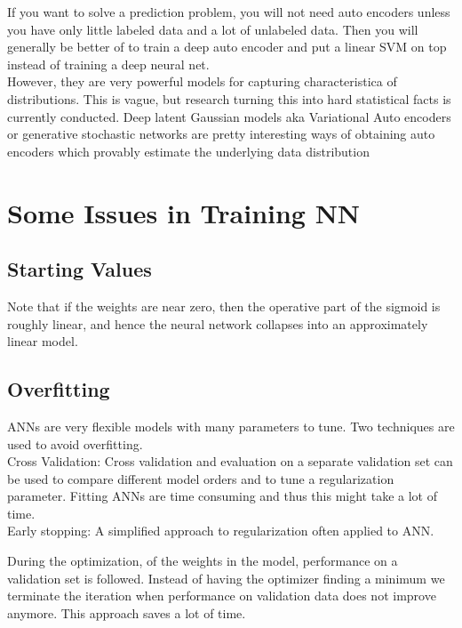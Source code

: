 If you want to solve a prediction problem, you will not need auto encoders unless you have only little labeled data and a lot of unlabeled data. Then you will generally be better of to train a deep auto encoder and put a linear SVM on top instead of training a deep neural net.\\

However, they are very powerful models for capturing characteristica of distributions. This is vague, but research turning this into hard statistical facts is currently conducted. Deep latent Gaussian models aka Variational Auto encoders or generative stochastic networks are pretty interesting ways of obtaining auto encoders which provably estimate the underlying data distribution

\section{Some Issues in Training NN}

\subsection{Starting Values}

Note that if the weights are near zero, then the operative part of the sigmoid is roughly linear, and hence the neural network collapses into an approximately linear model.

\subsection{Overfitting}

ANNs are very flexible models with many parameters to tune. Two
techniques are used to avoid overfitting.\\

Cross Validation: Cross validation and evaluation on a separate validation set can be
used to compare different model orders and to tune a regularization
parameter.
Fitting ANNs are time consuming and thus this might take a lot of
time.\\

Early stopping: A simplified approach to regularization often applied to ANN.

During the optimization, of the weights in the model, performance on
a validation set is followed. Instead of having the optimizer finding a
minimum we terminate the iteration when performance on validation
data does not improve anymore. This approach saves a lot of time.

